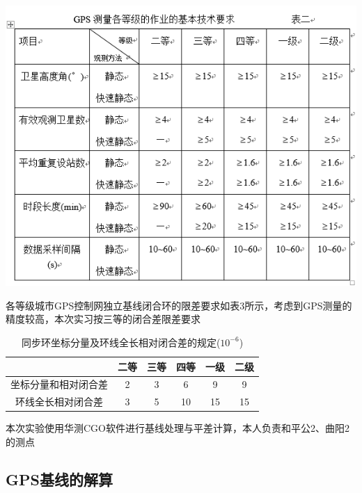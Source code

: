 \documentclass[a4paper,16pt,UTF8]{article}
\begin{document}
\begin{center}
    \includegraphics[scale = 1]{tab1.png}
\end{center}

各等级城市GPS控制网独立基线闭合环的限差要求如表3所示，考虑到GPS测量的精度较高，本次实习按三等的闭合差限差要求

\begin{longtable}{|c|c|c|c|c|c|}
    \caption{同步环坐标分量及环线全长相对闭合差的规定($10^{-6}$)}
    \\ \hline
          & 二等 & 三等 & 四等 & 一级 & 二级 \\ \hline
    坐标分量和相对闭合差 & 2 & 3 & 6 & 9 & 9 \\ \hline
    环线全长相对闭合差 & 3 & 5 & 10 & 15 & 15 \\ \hline
\end{longtable}

本次实验使用华测CGO软件进行基线处理与平差计算，本人负责和平公2、曲阳2的测点

\subsection{\Large GPS基线的解算}
\end{document}
